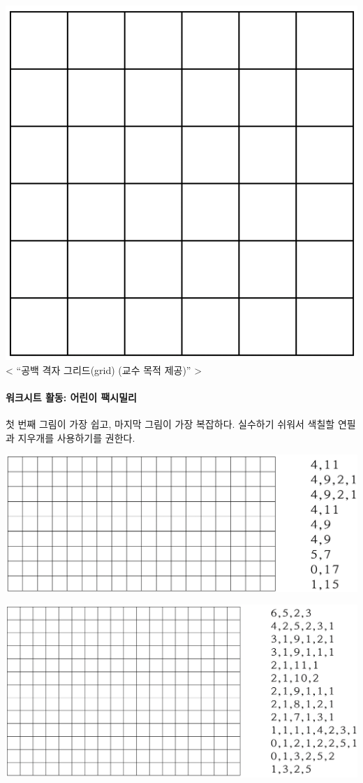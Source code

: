 \documentclass[]{article}
\begin{document}
\includegraphics{csunplugged/01-part/img/ch02-img/02-image-02-master-03.png}
\textless{} ``공백 격자 그리드(grid) (교수 목적 제공)'' \textgreater{}

\mbox{}\paragraph{워크시트 활동: 어린이 팩시밀리}\label{section-35}

첫 번째 그림이 가장 쉽고, 마지막 그림이 가장 복잡하다. 실수하기 쉬워서
색칠할 연필과 지우개를 사용하기를 권한다.

\includegraphics{csunplugged/01-part/img/ch02-img/02-image-03-worksheet-01.png}

\includegraphics{csunplugged/01-part/img/ch02-img/02-image-03-worksheet-02.png}
\end{document}
